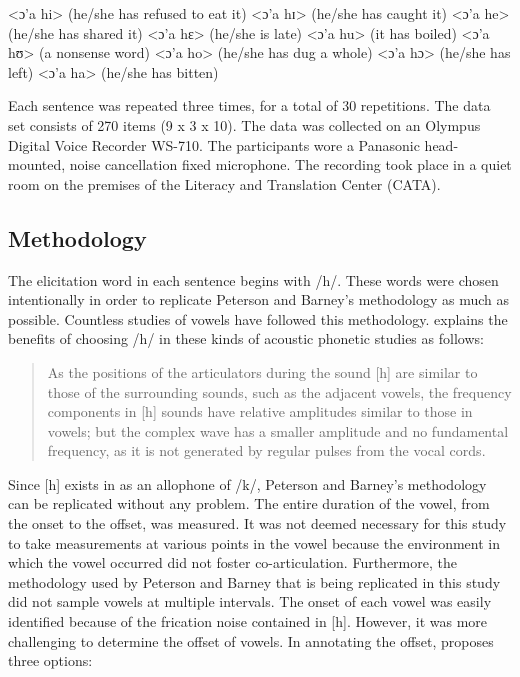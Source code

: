 \documentclass[output=paper,
modfonts
]{langscibook}
\begin{document}
\ea
  \ea <ɔ’a hi> (he/she has refused to eat it)
  \ex <ɔ’a hɪ> (he/she has caught it)
  \ex <ɔ’a he> (he/she has shared it)
  \ex <ɔ’a hɛ> (he/she is late)
  \ex <ɔ’a hu> (it has boiled)
  \ex <ɔ’a hʊ> (a nonsense word)
  \ex <ɔ’a ho> (he/she has dug a whole)
  \ex <ɔ’a hɔ> (he/she has left)
  \ex <ɔ’a ha> (he/she has bitten) 
  \z
\z

Each sentence was repeated three times, for a total of 30 repetitions. The data set consists of 270 items (9 x 3 x 10). The data was collected on an Olympus Digital Voice Recorder WS-710. The participants wore a Panasonic head-mounted, noise cancellation fixed microphone. The recording took place in a quiet room on the premises of the  Literacy and Translation Center (CATA). 

\subsection{Methodology}
The elicitation word in each sentence begins with /h/. These words were chosen intentionally in order to replicate Peterson and Barney’s methodology as much as possible. Countless studies of vowels have followed this methodology. \citet[112]{Ladefoged1996} explains the benefits of choosing /h/ in these kinds of acoustic phonetic studies as follows: 

\begin{quote}
As the positions of the articulators during the sound [h] are similar to those of the surrounding sounds, such as the adjacent vowels, the frequency components in [h] sounds have relative amplitudes similar to those in vowels; but the complex wave has a smaller amplitude and no fundamental frequency, as it is not generated by regular pulses from the vocal cords.
\end{quote}

Since [h] exists in  as an allophone of /k/, Peterson and Barney’s methodology can be replicated without any problem. The entire duration of the vowel, from the onset to the offset, was measured. It was not deemed necessary for this study to take measurements at various points in the vowel because the environment in which the vowel occurred did not foster co-articulation. Furthermore, the methodology used by Peterson and Barney that is being replicated in this study did not sample vowels at multiple intervals. The onset of each vowel was easily identified because of the frication noise contained in [h]. However, it was more challenging to determine the offset of vowels. In annotating the offset, \citet[142]{Thomas2011} proposes three options:
\end{document}
